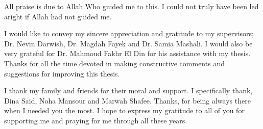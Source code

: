 \documentclass[12pt,onehalfspacing]{SketchThesis}
\begin{document}
\begin{acknowledgments}     
All praise is due to Allah Who guided me to this. I could not truly have been led aright if Allah had not guided me.

I would like to convey my sincere appreciation and gratitude to my supervisors; Dr. Nevin Darwish, Dr. Magdah Fayek and Dr. Samia Mashali. I would also be very grateful for Dr. Mahmoud Fakhr El Din for his assistance with my thesis. Thanks for all the time devoted in making constructive comments and suggestions for improving this thesis.

 I thank my family and friends for their moral and support. I specifically thank, Dina Said, Noha Mansour and Marwah Shafee. Thanks, for being always there when I needed you the most. I hope to express my gratitude to all of you for supporting me and praying for me through all these years.
 \end{acknowledgments}                                   %

\end{document}
